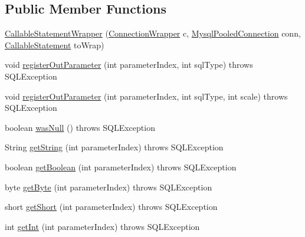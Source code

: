 \subsection*{Public Member Functions}
\begin{DoxyCompactItemize}
\item 
\mbox{\hyperlink{classcom_1_1mysql_1_1cj_1_1jdbc_1_1_callable_statement_wrapper_a60a04ffa9e3517620a85c8c64169050f}{Callable\+Statement\+Wrapper}} (\mbox{\hyperlink{classcom_1_1mysql_1_1cj_1_1jdbc_1_1_connection_wrapper}{Connection\+Wrapper}} c, \mbox{\hyperlink{classcom_1_1mysql_1_1cj_1_1jdbc_1_1_mysql_pooled_connection}{Mysql\+Pooled\+Connection}} conn, \mbox{\hyperlink{classcom_1_1mysql_1_1cj_1_1jdbc_1_1_callable_statement}{Callable\+Statement}} to\+Wrap)
\item 
void \mbox{\hyperlink{classcom_1_1mysql_1_1cj_1_1jdbc_1_1_callable_statement_wrapper_aae06c94e8cf571f5349751c14df82160}{register\+Out\+Parameter}} (int parameter\+Index, int sql\+Type)  throws S\+Q\+L\+Exception 
\item 
void \mbox{\hyperlink{classcom_1_1mysql_1_1cj_1_1jdbc_1_1_callable_statement_wrapper_a4de616b8da8f3443d0920d13442e81ed}{register\+Out\+Parameter}} (int parameter\+Index, int sql\+Type, int scale)  throws S\+Q\+L\+Exception 
\item 
boolean \mbox{\hyperlink{classcom_1_1mysql_1_1cj_1_1jdbc_1_1_callable_statement_wrapper_a22610654afb6f387f1b2cec382db2d77}{was\+Null}} ()  throws S\+Q\+L\+Exception 
\item 
String \mbox{\hyperlink{classcom_1_1mysql_1_1cj_1_1jdbc_1_1_callable_statement_wrapper_a7fde9ad7a833b2c7ba285efaf7dabc7a}{get\+String}} (int parameter\+Index)  throws S\+Q\+L\+Exception 
\item 
boolean \mbox{\hyperlink{classcom_1_1mysql_1_1cj_1_1jdbc_1_1_callable_statement_wrapper_ad8b6b2d6283febac1be43695a2ba4fe6}{get\+Boolean}} (int parameter\+Index)  throws S\+Q\+L\+Exception 
\item 
byte \mbox{\hyperlink{classcom_1_1mysql_1_1cj_1_1jdbc_1_1_callable_statement_wrapper_af77928ea8b1e57f114b720f577d3dc87}{get\+Byte}} (int parameter\+Index)  throws S\+Q\+L\+Exception 
\item 
short \mbox{\hyperlink{classcom_1_1mysql_1_1cj_1_1jdbc_1_1_callable_statement_wrapper_a0ab483116a0ce4623a5175bd7180a700}{get\+Short}} (int parameter\+Index)  throws S\+Q\+L\+Exception 
\item 
int \mbox{\hyperlink{classcom_1_1mysql_1_1cj_1_1jdbc_1_1_callable_statement_wrapper_a3751d784b7710faee7534a932450d64e}{get\+Int}} (int parameter\+Index)  throws S\+Q\+L\+Exception 

\end{DoxyCompactItemize}

